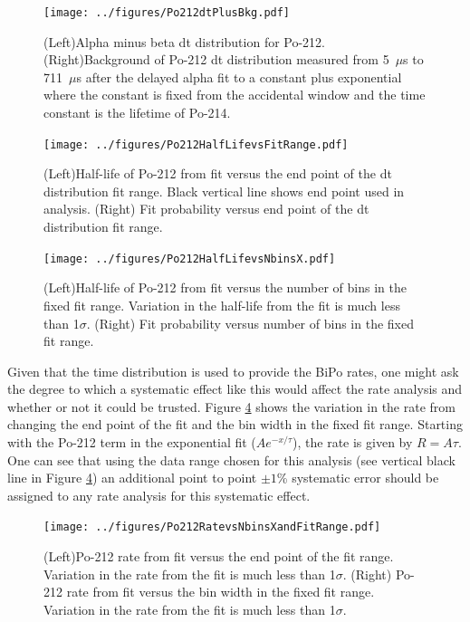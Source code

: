 \begin{figure}[!ht]
	\centering
	\texttt{[image: ../figures/Po212dtPlusBkg.pdf]}
	\caption{\label{fig:Po212dtplusbkg}(Left)Alpha minus beta dt distribution for Po-212. (Right)Background of Po-212 dt distribution measured from 5~$\mu$s to 711~$\mu$s after the delayed alpha fit to a constant plus exponential where the constant is fixed from the accidental window and the time constant is the lifetime of Po-214.}
\end{figure}
\begin{figure}[!h]
	\centering
	\texttt{[image: ../figures/Po212HalfLifevsFitRange.pdf]}
	\caption{\label{fig:Po212halflifevsfitrange} (Left)Half-life of Po-212 from fit versus the end point of the dt distribution fit range. Black vertical line shows end point used in analysis. (Right) Fit probability versus end point of the dt distribution fit range.}
\end{figure}
\begin{figure}[t]
\centering
	\texttt{[image: ../figures/Po212HalfLifevsNbinsX.pdf]}
	\caption{\label{fig:Po212halflifevsNbinsX}(Left)Half-life of Po-212 from fit versus the number of bins in the fixed fit range. Variation in the half-life from the fit is much less than 1$\sigma$.  (Right) Fit probability versus number of bins in the fixed fit range.}
\end{figure}

Given that the time distribution is used to provide the BiPo rates, one might ask the degree to which a systematic effect like this would affect the rate analysis and whether or not it could be trusted. Figure \ref{fig:Po212RatevsNbinsXandFitRange} shows the variation in the rate from changing the end point of the fit and the bin width in the fixed fit range. Starting with the Po-212 term in the exponential fit ($Ae^{-x/\tau}$), the rate is given by $R=A\tau$. One can see that using the data range chosen for this analysis (see vertical black line in Figure \ref{fig:Po212RatevsNbinsXandFitRange}) an additional point to point $\pm1$\% systematic error should be assigned to any rate analysis for this systematic effect. 
\begin{figure}[t]
 	\centering
 	\texttt{[image: ../figures/Po212RatevsNbinsXandFitRange.pdf]}
 	\caption{\label{fig:Po212RatevsNbinsXandFitRange}(Left)Po-212 rate from fit versus the end point of the fit range. Variation in the rate from the fit is much less than 1$\sigma$.  (Right) Po-212 rate from fit versus the bin width in the fixed fit range. Variation in the rate from the fit is much less than 1$\sigma$.}
\end{figure}

